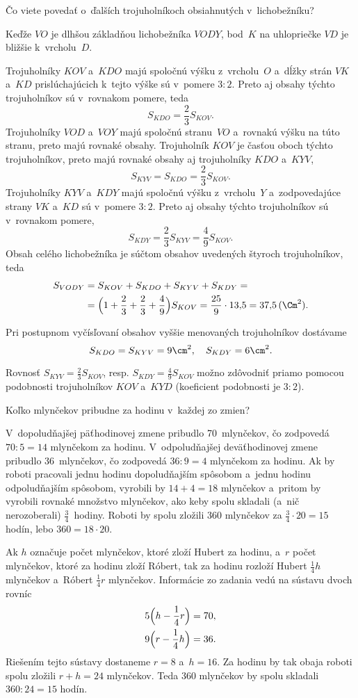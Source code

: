 {%
\napad
Čo viete povedať o~ďalších trojuholníkoch obsiahnutých v~lichobežníku?

\riesenie
Keďže $VO$ je dlhšou základňou lichobežníka $VODY$, bod~$K$ na uhlopriečke $V\!D$ je bližšie k~vrcholu~$D$.
%


Trojuholníky $KOV$ a~$KDO$ majú spoločnú výšku z~vrcholu~$O$ a~dĺžky strán $VK$ a~$KD$ prislúchajúcich k~tejto výške sú v~pomere $3:2$.
Preto aj obsahy týchto trojuholníkov sú v~rovnakom pomere, teda
$$
S_{KDO}=\frac23 S_{KOV}.
$$
Trojuholníky $VOD$ a~$VOY$ majú spoločnú stranu~$VO$ a~rovnakú výšku na túto stranu, preto majú rovnaké obsahy.
Trojuholník $KOV$ je časťou oboch týchto trojuholníkov, preto majú rovnaké obsahy aj trojuholníky $KDO$ a~$KYV$,
$$
S_{KYV}=S_{KDO}=\frac23S_{KOV}.
$$
Trojuholníky $KYV$ a~$KDY$ majú spoločnú výšku z~vrcholu~$Y$ a~zodpovedajúce strany $VK$ a~$KD$ sú v~pomere $3:2$.
Preto aj obsahy týchto trojuholníkov sú v~rovnakom pomere,
$$
S_{KDY}=\frac23 S_{KYV}=\frac49S_{KOV}.
$$
Obsah celého lichobežníka je súčtom obsahov uvedených štyroch trojuholníkov, teda
$$
\aligned
S_{VODY}&=S_{KOV}+S_{KDO}+S_{KYV}+S_{KDY} =\\
&=\Bigl( 1+\frac23+\frac23+\frac49 \Bigr) S_{KOV}
=\frac{25}9\cdot13{,}5
=37{,}5\,(\Cm^2).
\endaligned
$$

\poznamka
Pri postupnom vyčísľovaní obsahov vyššie menovaných trojuholníkov dostávame
$$
S_{KDO}=S_{KYV}=9\cm^2,\quad
S_{KDY}=6\cm^2.
$$

Rovnosť $S_{KYV}=\frac23S_{KOV}$, resp. $S_{KDY}=\frac49S_{KOV}$ možno zdôvodniť priamo pomocou podobnosti trojuholníkov $KOV$ a~$KYD$
(koeficient podobnosti je $3:2$).
}

{%
\napad
Koľko mlynčekov pribudne za hodinu v~každej zo zmien?

\riesenie
V~dopoludňajšej päťhodinovej zmene pribudlo 70~mlynčekov, čo zodpovedá ${70:5}=14$ mlynčekom za hodinu.
V~odpoludňajšej deväťhodinovej zmene pribudlo 36~mlynčekov, čo zodpovedá $36:9=4$ mlynčekom za hodinu.
Ak by roboti pracovali jednu hodinu dopoludňajším spôsobom a~jednu hodinu odpoludňajším spôsobom,
vyrobili by $14+4=18$ mlynčekov a~pritom by vyrobili rovnaké množstvo mlynčekov,
ako keby spolu skladali (a~nič nerozoberali) $\frac34$~hodiny.
Roboti by spolu zložili 360 mlynčekov za $\frac34\cdot 20=15$ hodín, lebo $360=18\cdot 20$.

\ineriesenie
Ak $h$ označuje počet mlynčekov, ktoré zloží Hubert za hodinu, a~$r$ počet mlynčekov,
ktoré za hodinu zloží Róbert, tak za hodinu rozloží Hubert $\frac14h$ mlynčekov
a~Róbert $\frac14r$ mlynčekov.
Informácie zo zadania vedú na sústavu dvoch rovníc
$$
\aligned
5\Big( h-\frac14r \Big) &=70, \\
9\Big( r-\frac14h \Big) &=36.
\endaligned
$$
Riešením tejto sústavy dostaneme $r=8$ a~$h=16$.
Za hodinu by tak obaja roboti spolu zložili $r+h=24$ mlynčekov.
Teda 360 mlynčekov by spolu skladali $360:24=15$ hodín.
}

